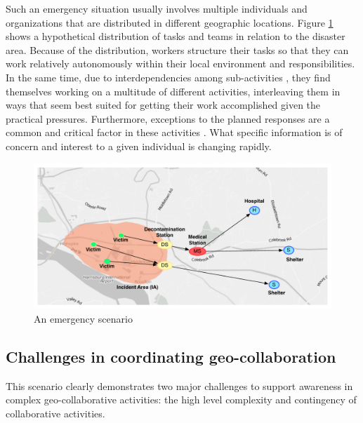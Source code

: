 Such an emergency situation usually involves multiple individuals and organizations that are distributed in different geographic locations. Figure \ref{fig:scenario_overview} shows a hypothetical distribution of tasks and teams in relation to the disaster area. Because of the distribution, workers structure their tasks so that they can work relatively autonomously within their local environment and responsibilities. In the same time, due to interdependencies among sub-activities \cite{shen2004managing}, they find themselves working on a multitude of different activities, interleaving them in ways that seem best suited for getting their work accomplished given the practical pressures. Furthermore, exceptions to the planned responses are a common and critical factor in these activities \cite{Turoff2004}. What specific information is of concern and interest to a given individual is changing rapidly.

\begin{figure}[htbp] %
   \centering
   \includegraphics[width=5.8in]{scenario.pdf} 
   \caption{An emergency scenario}
   \label{fig:scenario_overview}
\end{figure}





\subsection{Challenges in coordinating geo-collaboration} %
\label{sub:challenges_in_coordination}
This scenario clearly demonstrates two major challenges to support awareness in complex geo-collaborative activities: the high level complexity and contingency of collaborative activities.


